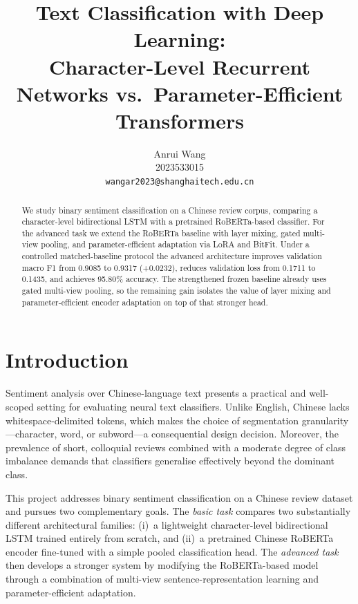 \documentclass{article}
\title{Text Classification with Deep Learning:\\
  Character-Level Recurrent Networks vs.\ Parameter-Efficient Transformers}
\author{%
  Anrui Wang \\
  2023533015 \\
  \texttt{wangar2023@shanghaitech.edu.cn}
}
\begin{document}
\maketitle

\begin{abstract}
We study binary sentiment classification on a Chinese review corpus, comparing
a character-level bidirectional LSTM with a pretrained RoBERTa-based classifier.
For the advanced task we extend the RoBERTa baseline with layer mixing, gated
multi-view pooling, and parameter-efficient adaptation via LoRA and BitFit.
Under a controlled matched-baseline protocol the advanced architecture improves
validation macro F1 from 0.9085 to 0.9317 (+0.0232), reduces validation loss
from 0.1711 to 0.1435, and achieves 95.80\% accuracy.  The strengthened frozen
baseline already uses gated multi-view pooling, so the remaining gain isolates
the value of layer mixing and parameter-efficient encoder adaptation on top of
that stronger head.
\end{abstract}

\section{Introduction}

Sentiment analysis over Chinese-language text presents a practical and
well-scoped setting for evaluating neural text classifiers.  Unlike English,
Chinese lacks whitespace-delimited tokens, which makes the choice of
segmentation granularity---character, word, or subword---a consequential design
decision.  Moreover, the prevalence of short, colloquial reviews combined with
a moderate degree of class imbalance demands that classifiers generalise
effectively beyond the dominant class.

This project addresses binary sentiment classification on a Chinese review
dataset and pursues two complementary goals.  The \emph{basic task} compares
two substantially different architectural families: (i)~a lightweight
character-level bidirectional LSTM trained entirely from scratch, and (ii)~a
pretrained Chinese RoBERTa encoder fine-tuned with a simple pooled
classification head.  The \emph{advanced task} then develops a stronger system
by modifying the RoBERTa-based model through a combination of multi-view
sentence-representation learning and parameter-efficient adaptation.
\end{document}
